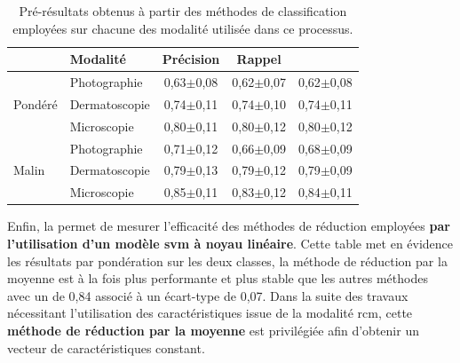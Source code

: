 \begin{table}[H]
    \centering
    \begin{tabular}{llccc} \toprule
        \multicolumn{1}{l}{}     & Modalité      & Précision    & Rappel        & \Fscore{}     \\ \midrule
        \multirow{3}{*}{Pondéré} & Photographie  & 0,63$\pm$0,08& 0,62$\pm$0,07 & 0,62$\pm$0,08 \\
                                 & Dermatoscopie & 0,74$\pm$0,11& 0,74$\pm$0,10 & 0,74$\pm$0,11 \\
                                 & Microscopie   & 0,80$\pm$0,11& 0,80$\pm$0,12 & 0,80$\pm$0,12 \\ \midrule
        \multirow{3}{*}{Malin}   & Photographie  & 0,71$\pm$0,12& 0,66$\pm$0,09 & 0,68$\pm$0,09 \\
                                 & Dermatoscopie & 0,79$\pm$0,13& 0,79$\pm$0,12 & 0,79$\pm$0,09 \\
                                 & Microscopie   & 0,85$\pm$0,11& 0,83$\pm$0,12 & 0,84$\pm$0,11 \\ \bottomrule
    \end{tabular}
    \caption{Pré-résultats obtenus à partir des méthodes de classification employées sur chacune des modalité utilisée dans ce processus.}
    \label{tab:results_multimodality_modalities}
\end{table}

Enfin, la  permet de mesurer l'efficacité des méthodes de réduction employées \textbf{par l'utilisation d'un modèle \gls{svm} à noyau linéaire}. Cette table met en évidence les résultats par pondération sur les deux classes, la méthode de réduction par la moyenne est à la fois plus performante et plus stable que les autres méthodes avec un \fscore{} de 0,84 associé à un écart-type de 0,07. Dans la suite des travaux nécessitant l'utilisation des caractéristiques issue de la modalité \gls{rcm}, cette \textbf{méthode de réduction par la moyenne} est privilégiée afin d'obtenir un vecteur de caractéristiques constant.\par

